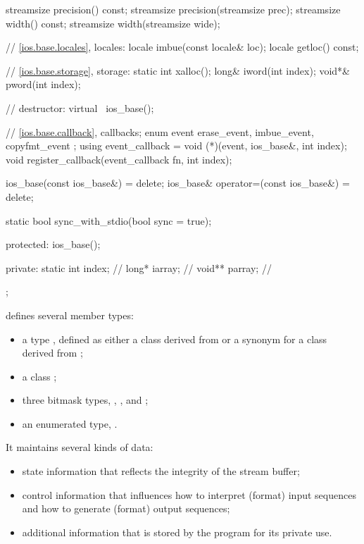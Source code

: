 \begin{codeblock}
{{    streamsize precision() const;
    streamsize precision(streamsize prec);
    streamsize width() const;
    streamsize width(streamsize wide);

    // \ref{ios.base.locales}, locales:
    locale imbue(const locale& loc);
    locale getloc() const;

    // \ref{ios.base.storage}, storage:
    static int xalloc();
    long&  iword(int index);
    void*& pword(int index);

    // destructor:
    virtual ~ios_base();

    // \ref{ios.base.callback}, callbacks;
    enum event { erase_event, imbue_event, copyfmt_event };
    using event_callback = void (*)(event, ios_base&, int index);
    void register_callback(event_callback fn, int index);

    ios_base(const ios_base&) = delete;
    ios_base& operator=(const ios_base&) = delete;

    static bool sync_with_stdio(bool sync = true);

  protected:
    ios_base();

  private:
    static int index;  // \expos
    long*  iarray;     // \expos
    void** parray;     // \expos
  };
}
\end{codeblock}

\pnum
{}
defines several member types:
\begin{itemize}
\item a type , defined as either a class derived from
 or a synonym for a class derived from ;

\item a class ;

\item three bitmask types, , , and ;

\item an enumerated type, .
\end{itemize}

\pnum
It maintains several kinds of data:
\begin{itemize}
\item
state information that reflects the integrity of the stream buffer;
\item
control information that influences how to interpret (format) input
sequences and how to generate (format) output sequences;
\item
additional information that is stored by the program for its private use.
\end{itemize}

